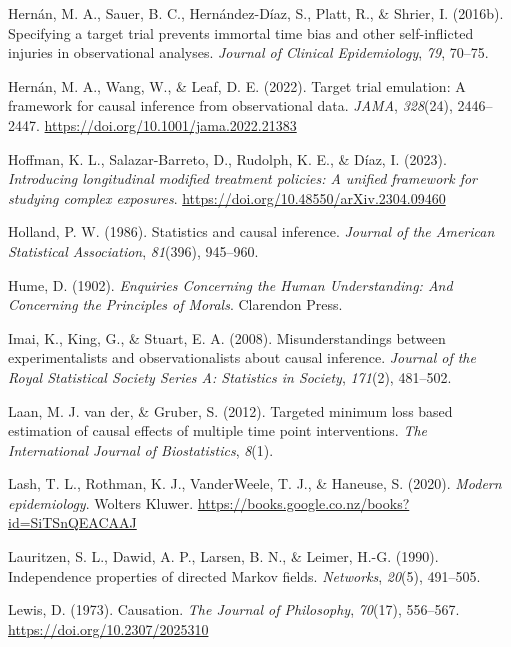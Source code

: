 \documentclass[
  single column]{article}
\newlength{\cslhangindent}
\newenvironment{CSLReferences}[2] %
 {\begin{list}{}{%
  \setlength{\itemindent}{0pt}
  \setlength{\leftmargin}{0pt}
  \setlength{\parsep}{0pt}
  \ifodd #1
   \setlength{\leftmargin}{\cslhangindent}
   \setlength{\itemindent}{-1\cslhangindent}
  \fi
  \setlength{\itemsep}{#2\baselineskip}}}
 {\end{list}}
\begin{document}
\begin{CSLReferences}{1}{0}
Hernán, M. A., Sauer, B. C., Hernández-Díaz, S., Platt, R., \& Shrier,
I. (2016b). Specifying a target trial prevents immortal time bias and
other self-inflicted injuries in observational analyses. \emph{Journal
of Clinical Epidemiology}, \emph{79}, 70--75.

Hernán, M. A., Wang, W., \& Leaf, D. E. (2022). Target trial emulation:
A framework for causal inference from observational data. \emph{JAMA},
\emph{328}(24), 2446--2447.
\url{https://doi.org/10.1001/jama.2022.21383}

Hoffman, K. L., Salazar-Barreto, D., Rudolph, K. E., \& Díaz, I. (2023).
\emph{Introducing longitudinal modified treatment policies: A unified
framework for studying complex exposures}.
\url{https://doi.org/10.48550/arXiv.2304.09460}

Holland, P. W. (1986). Statistics and causal inference. \emph{Journal of
the American Statistical Association}, \emph{81}(396), 945--960.

Hume, D. (1902). \emph{Enquiries Concerning the Human Understanding: And
Concerning the Principles of Morals}. Clarendon Press.

Imai, K., King, G., \& Stuart, E. A. (2008). Misunderstandings between
experimentalists and observationalists about causal inference.
\emph{Journal of the Royal Statistical Society Series A: Statistics in
Society}, \emph{171}(2), 481--502.

Laan, M. J. van der, \& Gruber, S. (2012). Targeted minimum loss based
estimation of causal effects of multiple time point interventions.
\emph{The International Journal of Biostatistics}, \emph{8}(1).

Lash, T. L., Rothman, K. J., VanderWeele, T. J., \& Haneuse, S. (2020).
\emph{Modern epidemiology}. Wolters Kluwer.
\url{https://books.google.co.nz/books?id=SiTSnQEACAAJ}

Lauritzen, S. L., Dawid, A. P., Larsen, B. N., \& Leimer, H.-G. (1990).
Independence properties of directed {M}arkov fields. \emph{Networks},
\emph{20}(5), 491--505.

Lewis, D. (1973). Causation. \emph{The Journal of Philosophy},
\emph{70}(17), 556--567. \url{https://doi.org/10.2307/2025310}


\end{CSLReferences}
\end{document}
